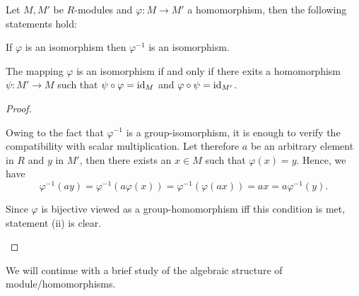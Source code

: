 \begin{lem}
Let $M,M'$ be $R$-modules and $\varphi\colon M\rightarrow M'$ a homomorphism, then the following statements hold:
\begin{thmlist}
\item If $\varphi$ is an isomorphism then $\varphi^{-1}$ is an isomorphism.
\item The mapping $\varphi$ is an isomorphism if and only if there exits a homomorphism $\psi\colon M'\rightarrow M$ such that $\psi\circ\varphi=\operatorname{id}_M$ and $\varphi\circ\psi=\operatorname{id}_{M'}$.
\end{thmlist}
\end{lem}
\begin{proof}
\begin{plist}
\item Owing to the fact that $\varphi^{-1}$ is a group-isomorphism, it is enough to verify the compatibility with scalar multiplication. Let therefore $a$ be an arbitrary element in $R$ and $y$ in $M'$, then there exists an $x\in M$ such that $\varphi(x)=y$. Hence, we have
\begin{equation*}
\varphi^{-1}(ay)=\varphi^{-1}(a\varphi(x))=\varphi^{-1}(\varphi(ax))=ax=a\varphi^{-1}(y).
\end{equation*}
\item Since $\varphi$ is bijective viewed as a group-homomorphism iff this condition is met, statement (ii) is clear.
\end{plist}
\end{proof}

We will continue with a brief study of the algebraic structure of module\-/homomorphisms.

